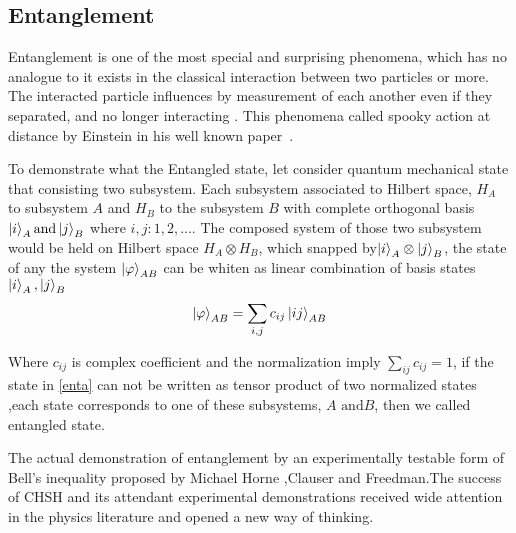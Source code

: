 \subsection{Entanglement}\hfill \break
Entanglement is one of the most special and surprising phenomena, which has no analogue to it exists in the classical interaction between two particles or more\citep{PhysRevLett.78.5022}. The interacted particle influences by measurement of each another even if they separated, and no longer interacting . This phenomena called spooky action at distance by Einstein in his well known paper~\cite{EPR}.

To demonstrate what the Entangled state, let consider quantum mechanical state that consisting two subsystem. Each subsystem associated to Hilbert space, $H_A$ to subsystem $A$ and $H_B$ to the subsystem $B$ with complete orthogonal basis $\ket{i}_A \text{and} \ket{j}_B$ where $i,j:1,2,\dots$. 
The composed system of those two subsystem would be held on Hilbert space $H_A\otimes H_B$, which snapped by$\ket{i}_A \otimes \ket{j}_B$, the state of any the system $\ket{\varphi}_{AB}$ can be whiten as linear combination of basis states $\ket{i}_A ,\ket{j}_B$
\begin{equation}\label{enta}
\ket{\varphi}_{AB}=\sum_{i,j} c_{ij} \ket{ij}_{AB}
\end{equation}

Where $c_{ij}$ is complex coefficient and the normalization imply $\sum_{ij} c_{ij}=1$, if the state in \ref{enta} can not be written as tensor product of two normalized states ,each state corresponds to one of these subsystems, $A\text{ and} B$, then we called entangled state.

The actual demonstration of entanglement by an experimentally testable form of Bell’s inequality proposed by Michael Horne ,Clauser and Freedman\citep{PhysRevLett.23.880}.The success of CHSH and its attendant experimental demonstrations received wide attention in the physics literature and opened a new way of thinking.

